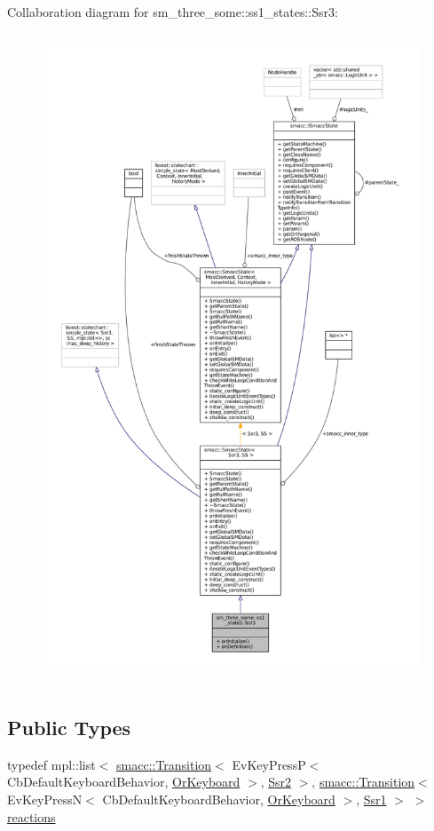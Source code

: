 Collaboration diagram for sm\+\_\+three\+\_\+some\+:\+:ss1\+\_\+states\+:\+:Ssr3\+:
\nopagebreak
\begin{figure}[H]
\begin{center}
\leavevmode
\includegraphics[height=550pt]{structsm__three__some_1_1ss1__states_1_1Ssr3__coll__graph}
\end{center}
\end{figure}
\subsection*{Public Types}
\begin{DoxyCompactItemize}
\item 
typedef mpl\+::list$<$ \hyperlink{classsmacc_1_1Transition}{smacc\+::\+Transition}$<$ Ev\+Key\+PressP$<$ Cb\+Default\+Keyboard\+Behavior, \hyperlink{classsm__three__some_1_1OrKeyboard}{Or\+Keyboard} $>$, \hyperlink{structsm__three__some_1_1ss1__states_1_1Ssr2}{Ssr2} $>$, \hyperlink{classsmacc_1_1Transition}{smacc\+::\+Transition}$<$ Ev\+Key\+PressN$<$ Cb\+Default\+Keyboard\+Behavior, \hyperlink{classsm__three__some_1_1OrKeyboard}{Or\+Keyboard} $>$, \hyperlink{structsm__three__some_1_1ss1__states_1_1Ssr1}{Ssr1} $>$ $>$ \hyperlink{structsm__three__some_1_1ss1__states_1_1Ssr3_a6189593dbf24f22a5a1b70aef804660e}{reactions}
\end{DoxyCompactItemize}
